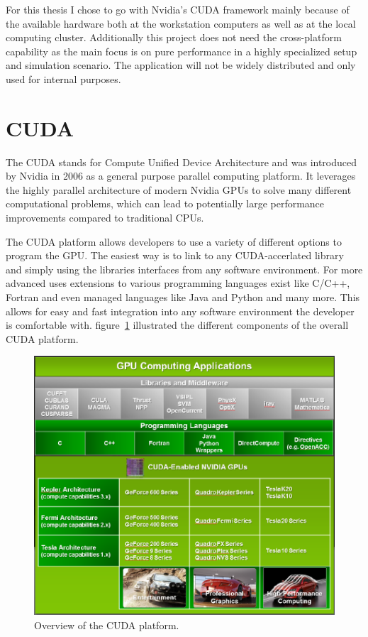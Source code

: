 \documentclass[a4paper,11pt]{kth-mag}
\begin{document}
For this thesis I chose to go with Nvidia's CUDA framework mainly because of the available hardware both at the workstation computers as well as at the local computing cluster. Additionally this project does not need the cross-platform capability as the main focus is on pure performance in a highly specialized setup and simulation scenario. The application will not be widely distributed and only used for internal purposes.

\section{CUDA}
\label{sec:CUDA}
The CUDA stands for Compute Unified Device Architecture and was introduced by Nvidia in 2006 as a general purpose parallel computing platform. It leverages the highly parallel architecture of modern Nvidia GPUs to solve many different computational problems, which can lead to potentially large performance improvements compared to traditional CPUs.

The CUDA platform allows developers to use a variety of different options to program the GPU. The easiest way is to link to any CUDA-accerlated library and simply using the libraries interfaces from any software environment. For more advanced uses extensions to various programming languages exist like C/C++, Fortran and even managed languages like Java and Python and many more. This allows for easy and fast integration into any software environment the developer is comfortable with. figure~\ref{fig:cuda_overview} illustrated the different components of the overall CUDA platform.

\begin{figure}
  \centering
  \includegraphics[width=\textwidth]{img/cuda_overview.pdf}
  \caption{Overview of the CUDA platform.}
  \label{fig:cuda_overview}
\end{figure}
\end{document}
